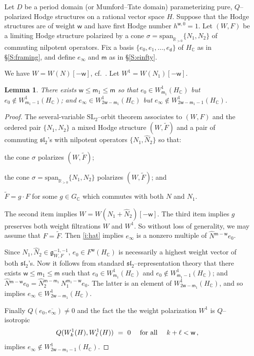 \documentclass[12pt]{amsart}
\numberwithin{equation}{section}
\numberwithin{table}{section}
\def\s{\sigma}
\def\bC{\mathbb{C}}
\def\fg{\mathfrak{g}}
\def\sfm{\mathsf{m}}
\def\bR{\mathbb{R}}
\def\tSL{\mathrm{SL}}
\def\fsl{\mathfrak{sl}}
\def\tspan{\mathrm{span}}
\def\sfw{\mathsf{w}}
\newtheorem{lemma}[equation]{Lemma}
\theoremstyle{definition}
\theoremstyle{definition}
\theoremstyle{remark}
\newenvironment{i_list}
  {\begin{enumerate}[label=(\roman*),itemsep=3pt,leftmargin=25pt,listparindent=20pt]}
  {\end{enumerate}}
\def\sfd{\mathsf{d}}
\begin{document}
Let $D$ be a period domain (or Mumford--Tate domain) parameterizing pure, $Q$--polarized Hodge structures on a rational vector space $H$.  Suppose that the Hodge structures are of weight $\sfw$ and have first Hodge number $h^{\sfw,0} = 1$.  Let $(W,F)$ be a limiting Hodge structure polarized by a cone $\s = \tspan_{\bR_{>0}}\{N_1,N_2\}$ of commuting nilpotent operators.  Fix a basis $\{e_0,e_1,\ldots,e_\sfd\}$ of $H_\bC$ as in \S\ref{S:framing}, and define $e_\infty$ and $\sfm$ as in \S\ref{S:einfty}.

We have $W = W(N)[-\sfw]$, cf.~\cite[(2.26)]{MR840721}.  Let $W^1 = W(N_1)[-\sfw]$.  

\begin{lemma} \label{L:m}
There exists $\sfw \le \sfm_1 \le \sfm$ so that $e_0 \in W^1_{\sfm_1}(H_\bC)$ but $e_0 \not\in W^1_{\sfm_1-1}(H_\bC)$; and $e_\infty \in W^1_{2\sfw-\sfm_1}(H_\bC)$ but $e_\infty \not\in W^1_{2\sfw-\sfm_1-1}(H_\bC)$.
\end{lemma}

\begin{proof}
The several-variable $\tSL_2$--orbit theorem \cite{MR840721} associates to $(W,F)$ and the ordered pair $\{N_1,N_2\}$ a mixed Hodge structure $(W,\tilde F)$ and a pair of commuting $\fsl_2$'s with nilpotent operators $\{N_1 , \hat N_2\}$ so that: 
\begin{i_list}
\item
the cone $\s$ polarizes $(W,\tilde F)$; 
\item \label{i:hat}
the cone $\hat\s = \tspan_{\bR_{>0}}\{N_1,\hat N_2\}$ polarizes $(W,\tilde F)$; and 
\item
$\tilde F = g \cdot F$ for some $g \in G_\bC$ which commutes with both $N$ and $N_1$.  
\end{i_list}
The second item implies $W = W(N_1+\hat N_2)[-\sfw]$.  The third item implies $g$ preserves both weight filtrations $W$ and $W^1$.  So without loss of generality, we may assume that $F = \tilde F$.    Then \ref{i:hat} implies $e_\infty$ is a nonzero multiple of $\hat N{}^{\sfm-\sfw} e_0$.  

Since $N_1,\hat N_2 \in \fg^{-1,-1}_{W,F}$, $e_0 \in F^\sfw(H_\bC)$ is necessarily a highest weight vector of both $\fsl_2$'s.  Now it follows from standard $\fsl_2$--representation theory that there exists $\sfw \le \sfm_1 \le \sfm$ such that $e_0 \in W^1_{\sfm_1}(H_\bC)$ and $e_0 \not\in W^1_{\sfm_1-1}(H_\bC)$; and $\hat N{}^{\sfm-\sfw} e_0 = \hat N{}_2^{\sfm-\sfm_1}\,N_1^{\sfm_1-\sfw} e_0$.  The latter is an element of $W^1_{2\sfw-\sfm_1}(H_\bC)$, and so implies $e_\infty \in W^1_{2\sfw-\sfm_1}(H_\bC)$.

Finally $Q(e_0,\overline{e_\infty}) \not=0$ and the fact the the weight polarization $W^1$ is $Q$--isotropic
\[
  Q(W^1_k(H) , W^1_\ell(H)) \ = \ 0
  \quad\hbox{ for all } \quad k+\ell < \sfw\,,
\]
implies $e_\infty \not \in W^1_{2\sfw-\sfm_1-1}(H_\bC)$.
\end{proof}
\end{document}
